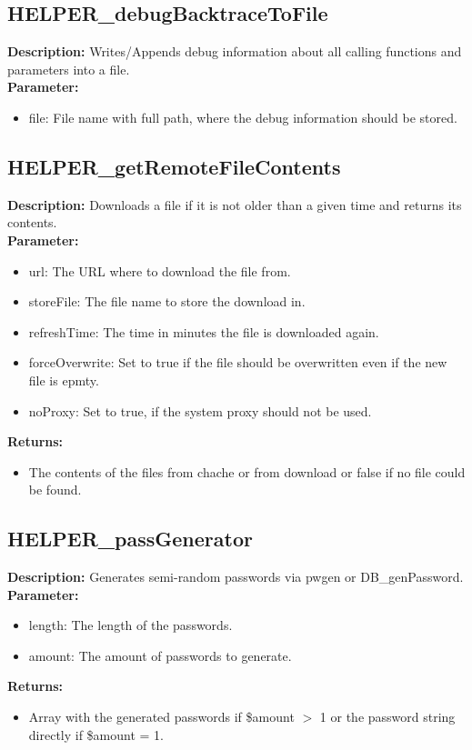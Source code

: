 \subsection{HELPER\_debugBacktraceToFile}
\textbf{Description:} Writes/Appends debug information about all calling functions and parameters into a file.\\
\textbf{Parameter:}
\begin{itemize}
\item file: File name with full path, where the debug information should be stored.
\end{itemize}

\subsection{HELPER\_getRemoteFileContents}
\textbf{Description:} Downloads a file if it is not older than a given time and returns its contents.\\
\textbf{Parameter:}
\begin{itemize}
\item url: The URL where to download the file from.
\item storeFile: The file name to store the download in.
\item refreshTime: The time in minutes the file is downloaded again.
\item forceOverwrite: Set to true if the file should be overwritten even if the new file is epmty.
\item noProxy: Set to true, if the system proxy should not be used.
\end{itemize}
\textbf{Returns:}
\begin{itemize}
\item The contents of the files from chache or from download or false if no file could be found.
\end{itemize}

\subsection{HELPER\_passGenerator}
\textbf{Description:} Generates semi-random passwords via pwgen or DB\_genPassword.\\
\textbf{Parameter:}
\begin{itemize}
\item length: The length of the passwords.
\item amount: The amount of passwords to generate.
\end{itemize}
\textbf{Returns:}
\begin{itemize}
\item Array with the generated passwords if \$amount $>$ 1 or the password string directly if \$amount = 1.
\end{itemize}

